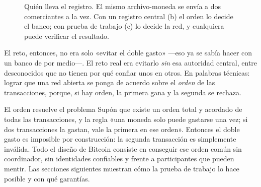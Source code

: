 \documentclass[11pt,a4paper]{article}
\begin{document}
\begin{figure}[tbp]
{}
\caption{Quién lleva el registro. El mismo archivo-moneda se envía a dos comerciantes a la vez. Con un registro central (b) el orden lo decide el banco; con prueba de trabajo (c) lo decide la red, y cualquiera puede verificar el resultado.}\label{fig:modelos-confianza}
\end{figure}

El reto, entonces, no era solo «evitar el doble gasto» ---eso ya se sabía hacer con un banco de por medio---. El reto real era evitarlo \emph{sin} esa autoridad central, entre desconocidos que no tienen por qué confiar unos en otros. En palabras técnicas: lograr que una red abierta se ponga de acuerdo sobre el \emph{orden} de las transacciones, porque, si hay orden, la primera gana y la segunda se rechaza.

\begin{nota}{El orden resuelve el problema}
Supón que existe un orden total y acordado de todas las transacciones, y la regla «una moneda solo puede gastarse una vez; si dos transacciones la gastan, vale la primera en ese orden». Entonces el doble gasto es imposible por construcción: la segunda transacción es simplemente inválida. Todo el diseño de Bitcoin consiste en conseguir ese orden común sin coordinador, sin identidades confiables y frente a participantes que pueden mentir. Las secciones siguientes muestran cómo la prueba de trabajo lo hace posible y con qué garantías.
\end{nota}

\end{document}
